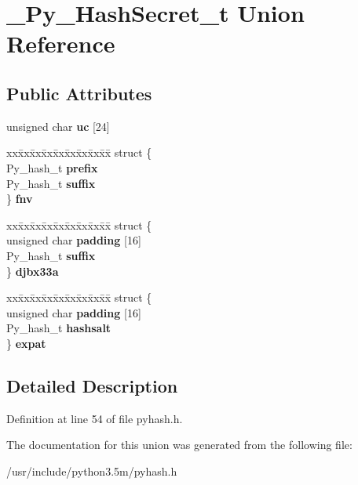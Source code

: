 \hypertarget{union__Py__HashSecret__t}{}\section{\+\_\+\+Py\+\_\+\+Hash\+Secret\+\_\+t Union Reference}
\label{union__Py__HashSecret__t}
\subsection*{Public Attributes}
\begin{DoxyCompactItemize}
\item 
unsigned char {\bfseries uc} \mbox{[}24\mbox{]}\hypertarget{union__Py__HashSecret__t_a34f652716d1b481946583c4fb44ae082}{}\label{union__Py__HashSecret__t_a34f652716d1b481946583c4fb44ae082}

\item 
\begin{tabbing}
xx\=xx\=xx\=xx\=xx\=xx\=xx\=xx\=xx\=\kill
struct \{\\
\>Py\_hash\_t {\bfseries prefix}\\
\>Py\_hash\_t {\bfseries suffix}\\
\} {\bfseries fnv}\hypertarget{union__Py__HashSecret__t_ac0f2312903943a789b9467b312333604}{}\label{union__Py__HashSecret__t_ac0f2312903943a789b9467b312333604}
\\

\end{tabbing}\item 
\begin{tabbing}
xx\=xx\=xx\=xx\=xx\=xx\=xx\=xx\=xx\=\kill
struct \{\\
\>unsigned char {\bfseries padding} \mbox{[}16\mbox{]}\\
\>Py\_hash\_t {\bfseries suffix}\\
\} {\bfseries djbx33a}\hypertarget{union__Py__HashSecret__t_a903143ebae99af38167f1f6310124064}{}\label{union__Py__HashSecret__t_a903143ebae99af38167f1f6310124064}
\\

\end{tabbing}\item 
\begin{tabbing}
xx\=xx\=xx\=xx\=xx\=xx\=xx\=xx\=xx\=\kill
struct \{\\
\>unsigned char {\bfseries padding} \mbox{[}16\mbox{]}\\
\>Py\_hash\_t {\bfseries hashsalt}\\
\} {\bfseries expat}\hypertarget{union__Py__HashSecret__t_ae0183c6536f9b3d0ae082a53d649a6b1}{}\label{union__Py__HashSecret__t_ae0183c6536f9b3d0ae082a53d649a6b1}
\\

\end{tabbing}\end{DoxyCompactItemize}


\subsection{Detailed Description}


Definition at line 54 of file pyhash.\+h.



The documentation for this union was generated from the following file\+:\begin{DoxyCompactItemize}
\item 
/usr/include/python3.\+5m/pyhash.\+h\end{DoxyCompactItemize}

